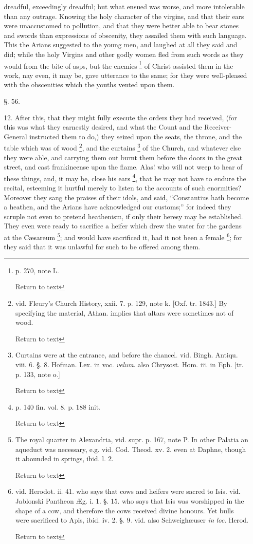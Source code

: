 dreadful, exceedingly dreadful; but what ensued was worse, and more intolerable than any outrage. Knowing the holy character of the
virgins, and that their ears were unaccustomed to pollution, and that
they were better able to bear stones and swords than expressions of
obscenity, they assailed them with such language. This the Arians
suggested to the young men, and laughed at all they said and did;
while the holy Virgins and other godly women fled from such words as
they would from the bite of asps, but the enemies \footnote{p. 270, note L.

Return to text} of Christ assisted them in the work, nay even, it may be, gave utterance to the
same; for they were well-pleased with the obscenities which the youths
vented upon them.

§. 56.

12. After this, that they might fully execute the
orders they had received, (for this was what they earnestly desired,
and what the Count and the Receiver-General instructed them to do,)
they seized upon the seats, the throne, and the table which was of
wood \footnote{vid. Fleury's Church History, xxii. 7. p.
129, note k. [Oxf. tr. 1843.] By specifying the material, Athan.
implies that altars were sometimes not of wood.

Return to text}, and the curtains \footnote{Curtains were at the entrance, and before the
chancel. vid. Bingh. Antiqu. viii. 6. §. 8. Hofman. Lex. in voc. \emph{velum}.
also Chrysost. Hom. iii. in Eph. [tr. p. 133, note o.]

Return to text} of the Church, and whatever
else they were able, and carrying them out burnt them before the doors
in the great street, and cast frankincense upon the flame. Alas! who
will not weep to hear of these things, and, it may be, close his ears
\footnote{p. 140 fin. vol. 8. p. 188 init.

Return to text}, that he may not have to endure the recital, esteeming it
hurtful merely to listen to the accounts of such enormities? Moreover
they sang the praises of their idols, and said, ``Constantius hath
become a heathen, and the Arians have acknowledged our customs;'' for
indeed they scruple not even to pretend heathenism, if only their
heresy may be established. They even were ready to sacrifice a heifer
which drew the water for the gardens at the Cæsareum \footnote{The royal quarter in Alexandria, vid. supr. p.
167, note P. In other Palatia an aqueduct was necessary, e.g. vid.
Cod. Theod. xv. 2. even at Daphne, though it abounded in springs,
ibid. l. 2.

Return to text}; and
would have sacrificed it, had it not been a female \footnote{vid. Herodot. ii. 41. who says that cows and
heifers were sacred to Isis. vid. Jablonski Pantheon Æg. i. 1. §.
15. who says that Isis was worshipped in the shape of a cow, and
therefore the cows received divine honours. Yet bulls were sacrificed
to Apis, ibid. iv. 2. §. 9. vid. also Schweighæuser \emph{in loc}.
Herod.

Return to text}; for they
said that it was unlawful for such to be offered among them.

